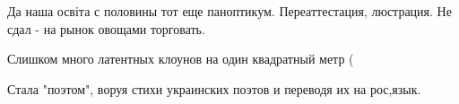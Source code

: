 \begin{itemize}
Да наша освіта с половины тот еще паноптикум. Переаттестация, люстрация. Не сдал - на рынок овощами торговать.

 
Слишком много латентных клоунов на один квадратный метр (

 
Стала "поэтом", воруя стихи украинских поэтов и переводя их на рос,язык.

\end{itemize}

